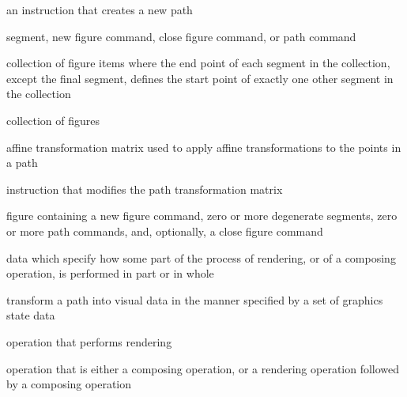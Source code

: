 %
 an instruction that creates a new path

%
segment, new figure command, close figure command, or path command

%
collection of figure items where the end point of each segment in the collection, except the final segment, defines the start point of exactly one other segment in the collection

%
collection of figures

%
affine transformation matrix used to apply affine transformations to the points in a path

%
instruction that modifies the path transformation matrix

%
figure containing a new figure command, zero or more degenerate segments, zero or more path commands, and, optionally, a close figure command

%
data which specify how some part of the process of rendering, or of a composing operation, is performed in part or in whole

%
transform a path into visual data in the manner specified by a set of graphics state data

%
operation that performs rendering

%
operation that is either a composing operation, or a rendering operation followed by a composing operation

%

%
%

